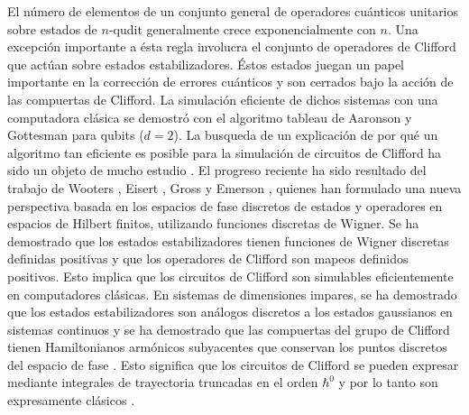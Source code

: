 \documentclass[a4paper]{report}
\begin{document}
  El número de elementos de un conjunto general de
  operadores cuánticos unitarios sobre estados de $n$-qudit
  generalmente crece exponencialmente con $n$. Una excepción
  importante a ésta regla involucra el conjunto de
  operadores de Clifford que actúan sobre estados
  estabilizadores. Éstos estados juegan un papel importante
  en la corrección de errores cuánticos
  \cite{gottesmanHeisenbergRepresentationQuantum1998} y son
  cerrados bajo la acción de las compuertas de Clifford. La
  simulación eficiente de dichos sistemas con una
  computadora clásica se demostró con el algoritmo tableau
  de Aaronson y Gottesman \cite{
    aaronsonImprovedSimulationStabilizer2004,
  gottesmanHeisenbergRepresentationQuantum1998} para qubits
  ($d=2$). La busqueda de un explicación de por qué un
  algoritmo tan eficiente es posible para la simulación de
  circuitos de Clifford ha sido un objeto de mucho estudio
  \cite{gottesmanFaultTolerantQuantumComputation1999,
    howardContextualitySuppliesMagic2014,
  mariPositiveWignerFunctions2012}. El progreso reciente ha
  sido resultado del trabajo de Wooters
  \cite{woottersWignerFunctionFormulationFiniteState1987},
  Eisert \cite{mariPositiveWignerFunctions2012}, Gross
  \cite{grossHudsonTheoremFinitedimensional2006} y Emerson
  \cite{howardContextualitySuppliesMagic2014}, quienes han
  formulado una nueva perspectiva basada en los espacios de
  fase discretos de estados y operadores en espacios de
  Hilbert finitos, utilizando funciones discretas de Wigner.
  Se ha demostrado que los estados estabilizadores tienen
  funciones de Wigner discretas definidas positivas y que
  los operadores de Clifford son mapeos definidos positivos.
  Esto implica que los circuitos de Clifford son simulables
  eficientemente en computadores clásicas. En sistemas de
  dimensiones impares, se ha demostrado que los estados
  estabilizadores son análogos discretos a los estados
  gaussianos en sistemas continuos
  \cite{grossHudsonTheoremFinitedimensional2006} y se ha
  demostrado que las compuertas del grupo de Clifford tienen
  Hamiltonianos armónicos subyacentes que conservan los
  puntos discretos del espacio de fase
  \cite{kociaSemiclassicalFormulationGottesmanKnill2017}.
  Esto significa que los circuitos de Clifford se pueden
  expresar mediante integrales de trayectoria truncadas en
  el orden $\hbar^{0}$ y por lo tanto son expresamente
  clásicos
  \cite{kociaSemiclassicalFormulationGottesmanKnill2017,
  kohComputingQuopitClifford2017}.
\end{document}
